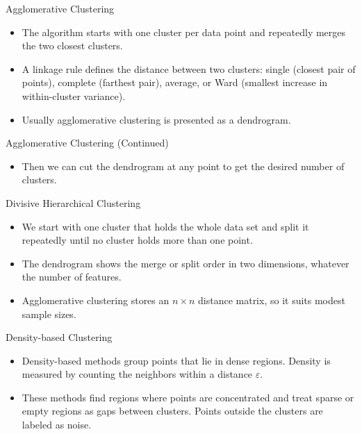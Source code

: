 \documentclass[aspectratio=169,xcolor=dvipsnames,svgnames,x11names,fleqn]{beamer}
\begin{document}
    \begin{frame}{Agglomerative Clustering}
        \begin{itemize}
           \item The algorithm starts with one cluster per data point and repeatedly merges the two closest clusters.
\item A linkage rule defines the distance between two clusters: single (closest pair of points), complete (farthest pair), average, or Ward (smallest increase in within-cluster variance).
            \item Usually agglomerative clustering is presented as a dendrogram.
        \end{itemize}
        \begin{center}
        \end{center}
    \end{frame}

    \begin{frame}{Agglomerative Clustering (Continued)}
        \begin{itemize}
        \item Then we can cut the dendrogram at any point to get the desired number of clusters.
    \end{itemize}
    \begin{center}
    \end{center}
\end{frame}

\begin{frame}{Divisive Hierarchical Clustering}
\begin{itemize}
\item We start with one cluster that holds the whole data set and split it repeatedly until no cluster holds more than one point.
\item The dendrogram shows the merge or split order in two dimensions, whatever the number of features.
\item Agglomerative clustering stores an $n \times n$ distance matrix, so it suits modest sample sizes.
\end{itemize}
\end{frame}

\begin{frame}{Density-based Clustering}
    \begin{itemize}
    \item Density-based methods group points that lie in dense regions. Density is measured by counting the neighbors within a distance $\varepsilon$.
\item These methods find regions where points are concentrated and treat sparse or empty regions as gaps between clusters. Points outside the clusters are labeled as noise.
\end{itemize}
\end{frame}
\end{document}
